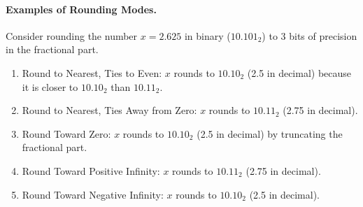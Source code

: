\paragraph{Examples of Rounding Modes.}
Consider rounding the number \( x = 2.625 \) in binary (\( 10.101_2 \)) to 3 bits of precision in the fractional part.

\begin{enumerate}
    \item Round to Nearest, Ties to Even:
     \( x \) rounds to \( 10.10_2 \) (2.5 in decimal) because it is closer to \( 10.10_2 \) than \( 10.11_2 \).
    \item Round to Nearest, Ties Away from Zero:
     \( x \) rounds to \( 10.11_2 \) (2.75 in decimal).
    \item Round Toward Zero:
     \( x \) rounds to \( 10.10_2 \) (2.5 in decimal) by truncating the fractional part.
    \item Round Toward Positive Infinity:
     \( x \) rounds to \( 10.11_2 \) (2.75 in decimal).
    \item Round Toward Negative Infinity:
     \( x \) rounds to \( 10.10_2 \) (2.5 in decimal).
\end{enumerate}

